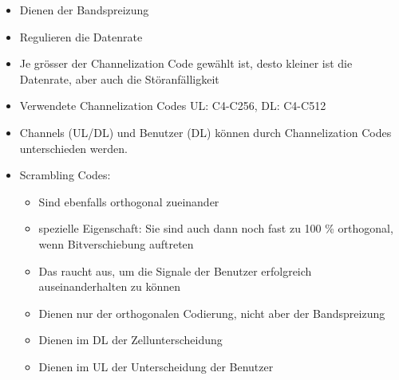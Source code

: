 \begin{minipage}{0.7\linewidth}
\begin{itemize}
\item Dienen der Bandspreizung
\item Regulieren die Datenrate
\item Je grösser der Channelization Code gewählt ist, desto kleiner ist die Datenrate, aber auch die Störanfälligkeit
\item Verwendete Channelization Codes UL: C4-C256, DL: C4-C512
\item Channels (UL/DL) und Benutzer (DL) können durch Channelization Codes unterschieden werden.
\item Scrambling Codes:
\begin{itemize}
\item Sind ebenfalls orthogonal zueinander
\item spezielle Eigenschaft: Sie sind auch dann noch fast zu 100 \% orthogonal, wenn Bitverschiebung auftreten
\item Das raucht aus, um die Signale der Benutzer erfolgreich auseinanderhalten zu können
\item Dienen nur der orthogonalen Codierung, nicht aber der Bandspreizung
\item Dienen im DL der Zellunterscheidung
\item Dienen im UL der Unterscheidung der Benutzer
\end{itemize}
\end{itemize}


\end{minipage}
